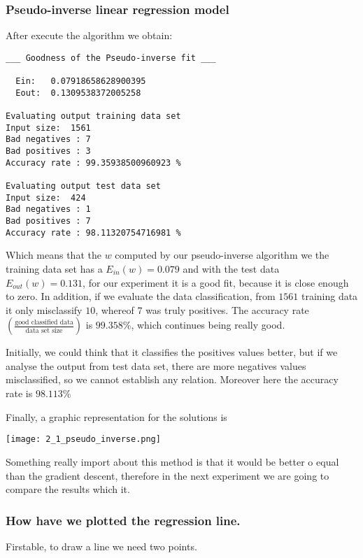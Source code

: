   \subsubsection{Pseudo-inverse linear regression model}

  After execute the algorithm we obtain:

\begin{verbatim}
___ Goodness of the Pseudo-inverse fit ___

  Ein:   0.07918658628900395
  Eout:  0.1309538372005258

Evaluating output training data set
Input size:  1561
Bad negatives : 7
Bad positives : 3
Accuracy rate : 99.35938500960923 %

Evaluating output test data set
Input size:  424
Bad negatives : 1
Bad positives : 7
Accuracy rate : 98.11320754716981 %

\end{verbatim}

  Which means that the $w$ computed by our pseudo-inverse algorithm we the training data set has a $E_{in}(w) = 0.079$ and with the test data $E_{out}(w) = 0.131$, for our experiment it is a good fit, because it is close enough to zero. In addition, if we evaluate the data classification,
  from $1561$ training data it only misclassify $10$, whereof 7 was truly positives. The accuracy rate $(\frac{\text{good classified data}}{\text{data set size}})$
  is $99.358 \%$, which continues being really good.

  Initially, we could think that it classifies the positives values better, but if we analyse the output from test data set, there are more negatives values misclassified, so we cannot establish any relation. Moreover here the accuracy rate is $98.113 \%$

  Finally, a graphic representation for the solutions is

  
  \texttt{[image: 2\_1\_pseudo\_inverse.png]}


  Something really import about this method is that it would be better o equal than the gradient descent, therefore in the next experiment we are going to compare the results which it. 

  \subsubsection{How have we plotted the regression line.}

  Firstable, to draw a line we need two points.

